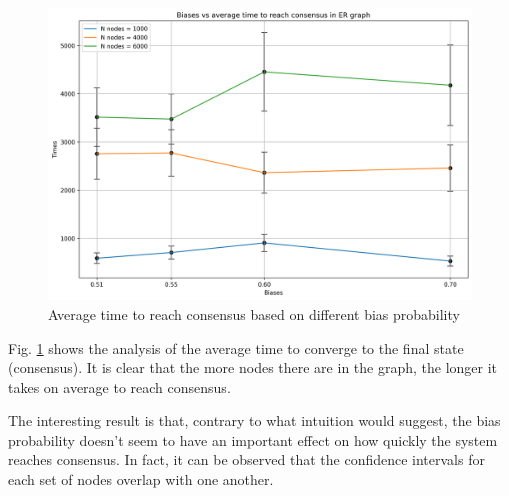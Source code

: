 \documentclass[conference]{IEEEtran}
\begin{document}
        \begin{figure}[!ht]
            \centering
            \includegraphics[width=\columnwidth]{media/er_times.png}
            \caption[short]{Average time to reach consensus based on different bias probability}
            \label{fig:er_times}
        \end{figure}

        Fig. \ref{fig:er_times} shows the analysis of the average time to converge to the final state (consensus).
        It is clear that the more nodes there are in the graph, the longer it takes on average to reach consensus.
        
        The interesting result is that, contrary to what intuition would suggest, the bias probability doesn't seem to have an important effect on how quickly the system reaches consensus.
        In fact, it can be observed that the confidence intervals for each set of nodes overlap with one another.

\end{document}
